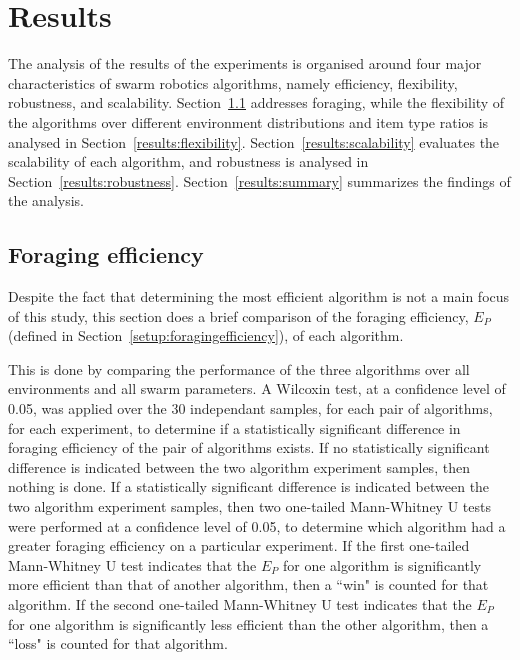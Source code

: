 \chapter{Results}
\label{chap:results}

The analysis of the results of the experiments is organised around four major characteristics of swarm robotics algorithms, namely efficiency, flexibility, robustness, and scalability. Section~\ref{results:efficiency} addresses foraging, while the flexibility of the algorithms over different environment distributions and item type ratios is analysed in Section~\ref{results:flexibility}. Section~\ref{results:scalability} evaluates the scalability of each algorithm, and robustness is analysed in Section~\ref{results:robustness}. Section~\ref{results:summary} summarizes the findings of the analysis.

\section{Foraging efficiency}
\label{results:efficiency}


Despite the fact that determining the most efficient algorithm is not a main focus of this study, this section does a brief comparison of the foraging efficiency, $E_P$ (defined in Section~\ref{setup:foragingefficiency}), of each algorithm. 

This is done by comparing the performance of the three algorithms over all environments and all swarm parameters. A Wilcoxin test, at a confidence level of 0.05, was applied over the 30 independant samples, for each pair of algorithms, for each experiment, to determine if a statistically significant difference in foraging efficiency of the pair of algorithms exists. If no statistically significant difference is indicated between the two algorithm experiment samples, then nothing is done. If a statistically significant difference is indicated between the two algorithm experiment samples, then two one-tailed Mann-Whitney U tests were performed at a confidence level of 0.05, to determine which algorithm had a greater foraging efficiency on a particular experiment. If the first one-tailed Mann-Whitney U test indicates that the $E_P$ for one algorithm is significantly more efficient than that of another algorithm, then a ``win" is counted for that algorithm. If the second one-tailed Mann-Whitney U test indicates that the $E_P$ for one algorithm is significantly less efficient than the other algorithm, then a ``loss" is counted for that algorithm. 

